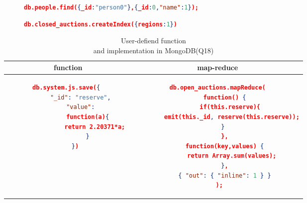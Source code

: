 \begin{figure}
\centering
\begin{lstlisting}[language=JSON, caption=XMark Query Q1 in MongoDB, label=mongo-xmark-q1,basicstyle=\ttfamily\footnotesize]
		db.people.find({_id:"person0"},{_id:0,"name":1});
\end{lstlisting}
\centering
\begin{lstlisting}[language=JSON, caption=MongoDB secondary Index, label=mongodb-create-index,basicstyle=\ttfamily\footnotesize]
          db.closed_auctions.createIndex({regions:1})
\end{lstlisting}
\end{figure}


\begin{longtable}[hbt]{c|c}
    \caption{ User-defiend function \\and implementation in MongoDB(Q18)}
    \label{tbl:mongodb-q18}\\
    {function } & {map-reduce}\\
	\hline
\begin{minipage}{.3\textwidth}
\begin{lstlisting}[language=JSON,basicstyle=\ttfamily\footnotesize]
    db.system.js.save({ 
        "_id": "reserve", 
        "value": 
            function(a){ 
                return 2.20371*a; 
            } 
    })
\end{lstlisting}
\end{minipage} &
\begin{minipage}{.4\textwidth}
\begin{lstlisting}[language=JSON,basicstyle=\ttfamily\footnotesize]
db.open_auctions.mapReduce(
    function() {
       if(this.reserve){
        emit(this._id, reserve(this.reserve));
       }    
    },
    function(key,values) {
        return Array.sum(values);
    },
    { "out": { "inline": 1 } }
 );
\end{lstlisting}
\end{minipage}
\end{longtable}


